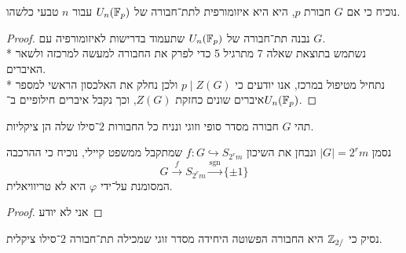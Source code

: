 \Subquestion{}
נוכיח כי אם $G$ חבורת $p$, היא היא איזומורפית לתת־חבורה של $U_n(\mathbb{F}_p)$ עבור $n$ טבעי כלשהו.
\begin{proof}
	נבנה תת־חבורה של $U_n(\mathbb{F}_p)$ שתעמוד בדרישות לאיזומורפיה עם $G$. \\*
	נשתמש בתוצאת שאלה 7 מתרגיל 5 כדי לפרק את החבורה למעשה למרכזה ולשאר האיברים. \\*
	נתחיל מטיפול במרכז, אנו יודעים כי $p \mid Z(G)$ ולכן נחלק את האלכסון הראשי למספר איברים שונים כחזקת $Z(G)$, וכך נקבל איברים חילופיים ב־$U_n(\mathbb{F}_p)$.
\end{proof}

\Question{}
תהי $G$ חבורה מסדר סופי וזוגי ונניח כל החבורות $2$־סילו שלה הן ציקליות.

\Subquestion{}
נסמן $|G| = 2^r m$ ונבחן את השיכון $f : G \hookrightarrow S_{2^r m}$ שמתקבל ממשפט קיילי, נוכיח כי ההרכבה
\[
	G \xrightarrow{f} S_{2^r m} \xrightarrow{\text{sgn}} \{\pm 1\}
\]
המסומנת על־ידי $\varphi$ היא לא טריוויאלית.
\begin{proof}
	אני לא יודע
\end{proof}

\Subquestion{}
נסיק כי $\mathbb{Z}_{2/}$ היא החבורה הפשוטה היחידה מסדר זוגי שמכילה תת־חבורה $2$־סילו ציקלית.


